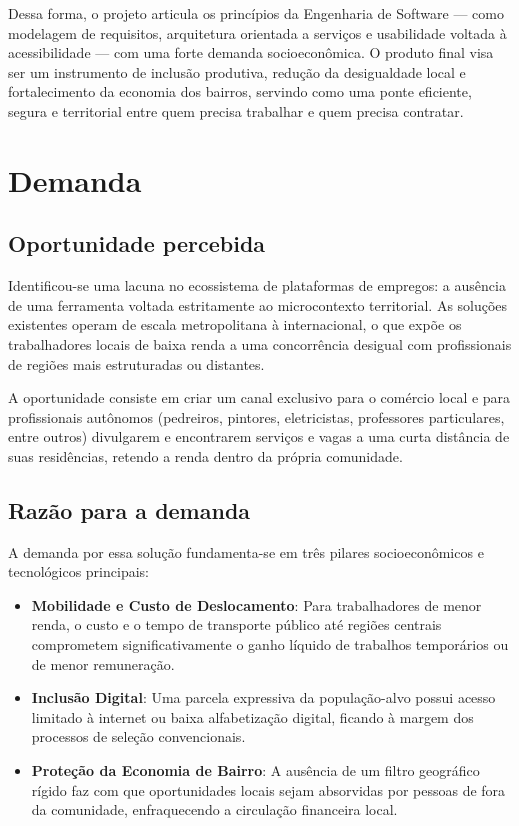 \documentclass[
    12pt,
    oneside,
    a4paper,
    brazil
]{abntex2}
\begin{document}
Dessa forma, o projeto articula os princípios da Engenharia de Software — como modelagem de requisitos, arquitetura orientada a serviços e usabilidade voltada à acessibilidade — com uma forte demanda socioeconômica. O produto final visa ser um instrumento de inclusão produtiva, redução da desigualdade local e fortalecimento da economia dos bairros, servindo como uma ponte eficiente, segura e territorial entre quem precisa trabalhar e quem precisa contratar.


\chapter{Demanda}

\section{Oportunidade percebida}
Identificou-se uma lacuna no ecossistema de plataformas de empregos: a ausência de uma ferramenta voltada estritamente ao microcontexto territorial. As soluções existentes operam de escala metropolitana à internacional, o que expõe os trabalhadores locais de baixa renda a uma concorrência desigual com profissionais de regiões mais estruturadas ou distantes.

A oportunidade consiste em criar um canal exclusivo para o comércio local e para profissionais autônomos (pedreiros, pintores, eletricistas, professores particulares, entre outros) divulgarem e encontrarem serviços e vagas a uma curta distância de suas residências, retendo a renda dentro da própria comunidade.

\section{Razão para a demanda}
A demanda por essa solução fundamenta-se em três pilares socioeconômicos e tecnológicos principais:

\begin{itemize}
    \item \textbf{Mobilidade e Custo de Deslocamento}: Para trabalhadores de menor renda, o custo e o tempo de transporte público até regiões centrais comprometem significativamente o ganho líquido de trabalhos temporários ou de menor remuneração.
    \item \textbf{Inclusão Digital}: Uma parcela expressiva da população-alvo possui acesso limitado à internet ou baixa alfabetização digital, ficando à margem dos processos de seleção convencionais.
    \item \textbf{Proteção da Economia de Bairro}: A ausência de um filtro geográfico rígido faz com que oportunidades locais sejam absorvidas por pessoas de fora da comunidade, enfraquecendo a circulação financeira local.
\end{itemize}
\end{document}
